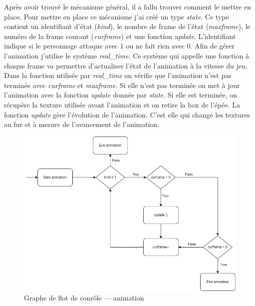 \documentclass{article}
\begin{document}
Après avoir trouvé le mécanisme général, il a fallu trouver comment le mettre en place. Pour mettre en place 
ce mécanisme j'ai créé un type \textit{state}. Ce type contient un identifiant d'état (\textit{kind}), le 
nombre de frame de l'état (\textit{maxframe}), le numéro de la frame courant (\textit{curframe}) et une 
fonction \textit{update}. L'identifiant indique si le personnage attaque avec $1$ ou ne fait rien avec $0$. 
Afin de gérer l'animation j'utilise le système \textit{real\_time}. Ce système qui appelle une fonction à 
chaque frame va permettre d'actualiser l'état de l'animation à la vitesse du jeu. Dans la fonction utilisée 
par \textit{real\_time} on vérifie que l'animation 
n'est pas terminée avec \textit{curframe} et \textit{maxframe}. Si elle n'est pas terminée on met à jour 
l'animation avec la fonction \textit{update} donnée par \textit{state}. Si elle est terminée, on récupère la texture 
utilisée avant l'animation et on retire la box de l'épée.
La fonction \textit{update} gère l'évolution de l'animation. C'est elle qui change les textures au fur et à 
mesure de l'avancement de l'animation.

\begin{center}
    \begin{figure}[ht]
        \includegraphics[scale=0.5]{img/exec.png}
        \caption{Graphe de flot de conrôle --- animation}
    \end{figure}
\end{center}

\end{document}
